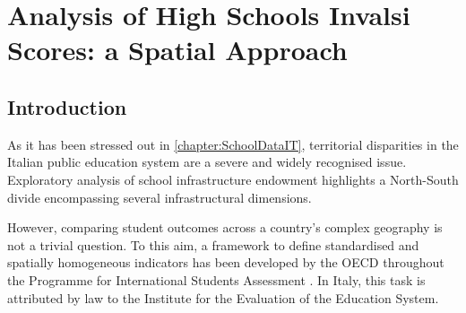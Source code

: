 \documentclass[openany]{book}
\begin{document}
\begin{appendices}

\end{appendices}

 \label{chapter:SchoolDataIT}

%
%


\chapter[Invalsi spatial analysis]{Analysis of High Schools Invalsi Scores: a Spatial Approach} \label{Chapter:Invalsi}
\section{Introduction}

 As it has been stressed out in \ref{chapter:SchoolDataIT}, territorial disparities in the Italian public education system are a severe and widely recognised issue. Exploratory analysis of school infrastructure endowment highlights a North-South divide encompassing several infrastructural dimensions.
 
 However, comparing student outcomes across a country's complex geography is not a trivial question. To this aim, a framework to define standardised and spatially homogeneous indicators has been developed by the OECD throughout the Programme for International Students Assessment \citep[PISA,][]{PISA}. In Italy, this task is attributed by law \citep{InvalsiLaw} to the Institute for the Evaluation of the Education System. 
 
\end{document}
